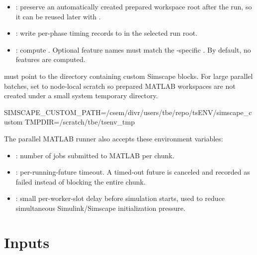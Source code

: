 \documentclass[11pt]{article}
\begin{document}
\begin{itemize}
preparation is skipped; otherwise the runner prepares into this root and preserves it.
\item {}: preserve an automatically created prepared workspace root after the run, so it can be
reused later with .
\item {}: write per-phase timing records to  in the selected run root.
\item {}: compute . Optional feature names must match the \termSimulator-specific
. By default, no features are computed.
\end{itemize}

 must point to the directory containing custom Simscape blocks.
For large parallel batches, set  to node-local scratch so prepared MATLAB workspaces are not created under a small
system temporary directory.

\begin{DocCode}
SIMSCAPE_CUSTOM_PATH=/csem/divr/users/tbe/repo/tsENV/simscape_custom
TMPDIR=/scratch/tbe/tsenv_tmp
\end{DocCode}

The parallel MATLAB runner also accepts these environment variables:

\begin{itemize}
\item {}: number of jobs submitted to MATLAB per chunk.
\item {}: per-running-future timeout. A timed-out future is canceled and recorded as failed
instead of blocking the entire chunk.
\item {}: small per-worker-slot delay before simulation starts, used to reduce
simultaneous Simulink/Simscape initialization pressure.
\end{itemize}

\section*{Inputs}
\end{document}

